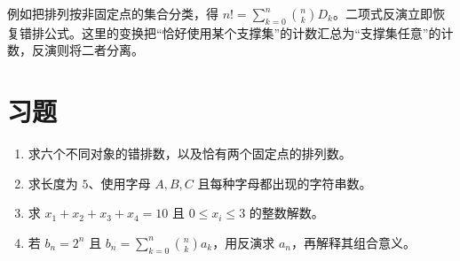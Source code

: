 例如把排列按非固定点的集合分类，得 $n!=\sum_{k=0}^n\binom nkD_k$。二项式反演立即恢复错排公式。这里的变换把“恰好使用某个支撑集”的计数汇总为“支撑集任意”的计数，反演则将二者分离。

\section{习题}
\begin{enumerate}
  \item\label{ex:inclusion-exclusion-1} 求六个不同对象的错排数，以及恰有两个固定点的排列数。
  \item\label{ex:inclusion-exclusion-2} 求长度为 $5$、使用字母 $A,B,C$ 且每种字母都出现的字符串数。
  \item\label{ex:inclusion-exclusion-3} 求 $x_1+x_2+x_3+x_4=10$ 且 $0\le x_i\le3$ 的整数解数。
  \item\label{ex:inclusion-exclusion-4} 若 $b_n=2^n$ 且 $b_n=\sum_{k=0}^n\binom nk a_k$，用反演求 $a_n$，再解释其组合意义。
\end{enumerate}

